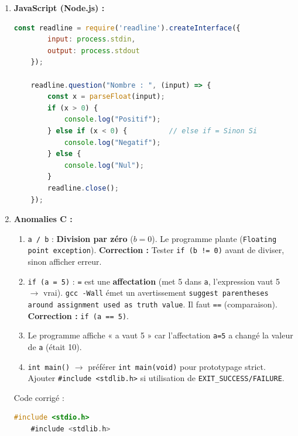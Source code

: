 \documentclass[11pt]{article}
\begin{document}
\begin{corrige}[Exercice n]
\begin{enumerate}
    \item \textbf{JavaScript (Node.js) :}
    \begin{lstlisting}[language=JavaScript]
    const readline = require('readline').createInterface({
        input: process.stdin,
        output: process.stdout
    });

    readline.question("Nombre : ", (input) => {
        const x = parseFloat(input);
        if (x > 0) {
            console.log("Positif");
        } else if (x < 0) {          // else if = Sinon Si
            console.log("Negatif");
        } else {
            console.log("Nul");
        }
        readline.close();
    });
    \end{lstlisting}
    \item \textbf{Anomalies C :}
    \begin{enumerate}
        \item [Ligne 5 - Exécution] \texttt{a / b} : \textbf{Division par zéro} ($b=0$). Le programme plante (\texttt{Floating point exception}). \textbf{Correction :} Tester \texttt{if (b != 0)} avant de diviser, sinon afficher erreur.
        \item [Ligne 6 - Compilation/Logique] \texttt{if (a = 5)} : \texttt{=} est une \textbf{affectation} (met 5 dans \texttt{a}, l'expression vaut 5 $\to$ vrai). \texttt{gcc -Wall} émet un avertissement \texttt{suggest parentheses around assignment used as truth value}. Il faut \texttt{==} (comparaison). \textbf{Correction :} \texttt{if (a == 5)}.
        \item [Logique] Le programme affiche « a vaut 5 » car l'affectation \texttt{a=5} a changé la valeur de \texttt{a} (était 10).
        \item [Style] \texttt{int main()} $\to$ préférer \texttt{int main(void)} pour prototypage strict. Ajouter \texttt{\#include <stdlib.h>} si utilisation de \texttt{EXIT\_SUCCESS/FAILURE}.
    \end{enumerate}
    Code corrigé :
    \begin{lstlisting}[language=C]
    #include <stdio.h>
    #include <stdlib.h>


\end{lstlisting}
\end{enumerate}
\end{corrige}
\end{document}
